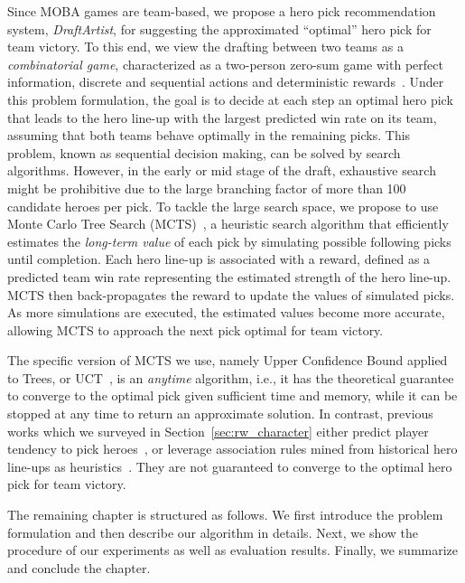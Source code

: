 Since MOBA games are team-based, we propose a hero pick recommendation system, \textit{DraftArtist}, for suggesting the approximated ``optimal'' hero pick for team victory. To this end, we view the drafting between two teams as a \textit{combinatorial game}, characterized as a two-person zero-sum game with perfect information, discrete and sequential actions and deterministic rewards~\cite{browne2012survey}. Under this problem formulation, the goal is to decide at each step an optimal hero pick that leads to the hero line-up with the largest predicted win rate on its team, assuming that both teams behave optimally in the remaining picks. This problem, known as sequential decision making, can be solved by search algorithms. However, in the early or mid stage of the draft, exhaustive search might be prohibitive due to the large branching factor of more than 100 candidate heroes per pick. To tackle the large search space, we propose to use Monte Carlo Tree Search (MCTS)~\citep{coulom2006efficient}, a heuristic search algorithm that efficiently estimates the \textit{long-term value} of each pick by simulating possible following picks until completion. Each hero line-up is associated with a reward, defined as a predicted team win rate representing the estimated strength of the hero line-up. MCTS then back-propagates the reward to update the values of simulated picks. As more simulations are executed, the estimated values become more accurate, allowing MCTS to approach the next pick optimal for team victory. 

The specific version of MCTS we use, namely Upper Confidence Bound applied to Trees, or UCT~\citep{kocsis2006bandit}, is an \textit{anytime} algorithm, i.e., it has the theoretical guarantee to converge to the optimal pick given sufficient time and memory, while it can be stopped at any time to return an approximate solution. In contrast, previous works which we surveyed in Section~\ref{sec:rw_character} either predict player tendency to pick heroes~\cite{summerville2017reco}, or leverage association rules mined from historical hero line-ups as heuristics~\cite{hanke2017reco}. They are not guaranteed to converge to the optimal hero pick for team victory.

The remaining chapter is structured as follows. We first introduce the problem formulation and then describe our algorithm in details. Next, we show the procedure of our experiments as well as evaluation results. Finally, we summarize and conclude the chapter.

